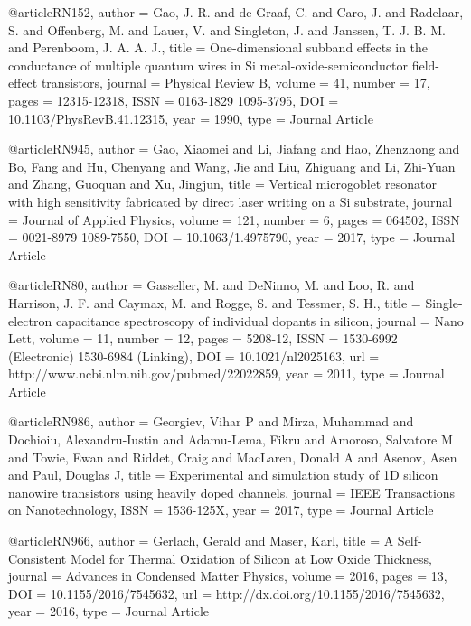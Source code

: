 @article{RN152,
   author = {Gao, J. R. and de Graaf, C. and Caro, J. and Radelaar, S. and Offenberg, M. and Lauer, V. and Singleton, J. and Janssen, T. J. B. M. and Perenboom, J. A. A. J.},
   title = {One-dimensional subband effects in the conductance of multiple quantum wires in Si metal-oxide-semiconductor field-effect transistors},
   journal = {Physical Review B},
   volume = {41},
   number = {17},
   pages = {12315-12318},
   ISSN = {0163-1829
1095-3795},
   DOI = {10.1103/PhysRevB.41.12315},
   year = {1990},
   type = {Journal Article}
}

@article{RN945,
   author = {Gao, Xiaomei and Li, Jiafang and Hao, Zhenzhong and Bo, Fang and Hu, Chenyang and Wang, Jie and Liu, Zhiguang and Li, Zhi-Yuan and Zhang, Guoquan and Xu, Jingjun},
   title = {Vertical microgoblet resonator with high sensitivity fabricated by direct laser writing on a Si substrate},
   journal = {Journal of Applied Physics},
   volume = {121},
   number = {6},
   pages = {064502},
   ISSN = {0021-8979
1089-7550},
   DOI = {10.1063/1.4975790},
   year = {2017},
   type = {Journal Article}
}

@article{RN80,
   author = {Gasseller, M. and DeNinno, M. and Loo, R. and Harrison, J. F. and Caymax, M. and Rogge, S. and Tessmer, S. H.},
   title = {Single-electron capacitance spectroscopy of individual dopants in silicon},
   journal = {Nano Lett},
   volume = {11},
   number = {12},
   pages = {5208-12},
   ISSN = {1530-6992 (Electronic)
1530-6984 (Linking)},
   DOI = {10.1021/nl2025163},
   url = {http://www.ncbi.nlm.nih.gov/pubmed/22022859},
   year = {2011},
   type = {Journal Article}
}

@article{RN986,
   author = {Georgiev, Vihar P and Mirza, Muhammad and Dochioiu, Alexandru-Iustin and Adamu-Lema, Fikru and Amoroso, Salvatore M and Towie, Ewan and Riddet, Craig and MacLaren, Donald A and Asenov, Asen and Paul, Douglas J},
   title = {Experimental and simulation study of 1D silicon nanowire transistors using heavily doped channels},
   journal = {IEEE Transactions on Nanotechnology},
   ISSN = {1536-125X},
   year = {2017},
   type = {Journal Article}
}

@article{RN966,
   author = {Gerlach, Gerald and Maser, Karl},
   title = {A Self-Consistent Model for Thermal Oxidation of Silicon at Low Oxide Thickness},
   journal = {Advances in Condensed Matter Physics},
   volume = {2016},
   pages = {13},
   DOI = {10.1155/2016/7545632},
   url = {http://dx.doi.org/10.1155/2016/7545632},
   year = {2016},
   type = {Journal Article}
}

